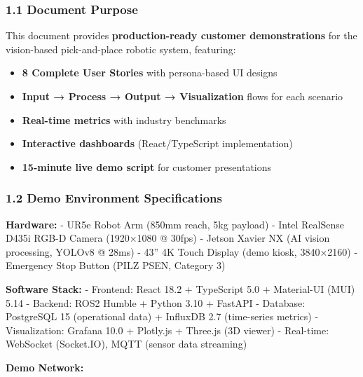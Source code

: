 \documentclass[
]{article}
\providecommand{\tightlist}{%
  \setlength{\itemsep}{0pt}\setlength{\parskip}{0pt}}
\begin{document}
\hypertarget{document-purpose}{%
\subsubsection{1.1 Document Purpose}\label{document-purpose}}

This document provides \textbf{production-ready customer demonstrations}
for the vision-based pick-and-place robotic system, featuring:

\begin{itemize}
\tightlist
\item
  \textbf{8 Complete User Stories} with persona-based UI designs
\item
  \textbf{Input → Process → Output → Visualization} flows for each
  scenario
\item
  \textbf{Real-time metrics} with industry benchmarks
\item
  \textbf{Interactive dashboards} (React/TypeScript implementation)
\item
  \textbf{15-minute live demo script} for customer presentations
\end{itemize}

\hypertarget{demo-environment-specifications}{%
\subsubsection{1.2 Demo Environment
Specifications}\label{demo-environment-specifications}}

\textbf{Hardware:} - UR5e Robot Arm (850mm reach, 5kg payload) - Intel
RealSense D435i RGB-D Camera (1920×1080 @ 30fps) - Jetson Xavier NX (AI
vision processing, YOLOv8 @ 28ms) - 43'' 4K Touch Display (demo kiosk,
3840×2160) - Emergency Stop Button (PILZ PSEN, Category 3)

\textbf{Software Stack:} - Frontend: React 18.2 + TypeScript 5.0 +
Material-UI (MUI) 5.14 - Backend: ROS2 Humble + Python 3.10 + FastAPI -
Database: PostgreSQL 15 (operational data) + InfluxDB 2.7 (time-series
metrics) - Visualization: Grafana 10.0 + Plotly.js + Three.js (3D
viewer) - Real-time: WebSocket (Socket.IO), MQTT (sensor data streaming)

\textbf{Demo Network:}
\end{document}
